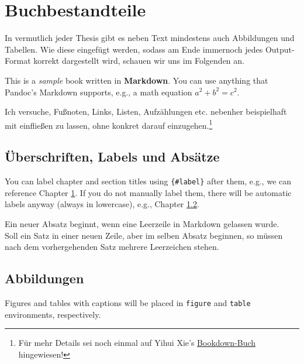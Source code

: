 \documentclass[]{book}
\let\rmarkdownfootnote\footnote%
\def\footnote{\protect\rmarkdownfootnote}
\theoremstyle{definition}
\theoremstyle{definition}
\theoremstyle{remark}
\begin{document}
\chapter{Buchbestandteile}\label{components}

In vermutlich jeder Thesis gibt es neben Text mindestens auch
Abbildungen und Tabellen. Wie diese eingefügt werden, sodass am Ende
immernoch jedes Output-Format korrekt dargestellt wird, schauen wir uns
im Folgenden an.

This is a \emph{sample} book written in \textbf{Markdown}. You can use
anything that Pandoc's Markdown supports, e.g., a math equation
\(a^2 + b^2 = c^2\).

Ich versuche, Fußnoten, Links, Listen, Aufzählungen etc. nebenher
beispielhaft mit einfließen zu lassen, ohne konkret darauf
einzugehen.\footnote{Für mehr Details sei noch einmal auf Yihui Xie's
  \href{https://bookdown.org/yihui/bookdown/components.html}{Bookdown-Buch}
  hingewiesen!}

\section{Überschriften, Labels und
Absätze}\label{uberschriften-labels-und-absatze}

You can label chapter and section titles using \texttt{\{\#label\}}
after them, e.g., we can reference Chapter \ref{components}. If you do
not manually label them, there will be automatic labels anyway (always
in lowercase), e.g., Chapter \ref{abbildungen}.

Ein neuer Absatz beginnt, wenn eine Leerzeile in Markdown gelassen
wurde.\\
Soll ein Satz in einer neuen Zeile, aber im selben Absatz beginnen, so
müssen nach dem vorhergehenden Satz mehrere Leerzeichen stehen.

\section{Abbildungen}\label{abbildungen}

Figures and tables with captions will be placed in \texttt{figure} and
\texttt{table} environments, respectively.
\end{document}
